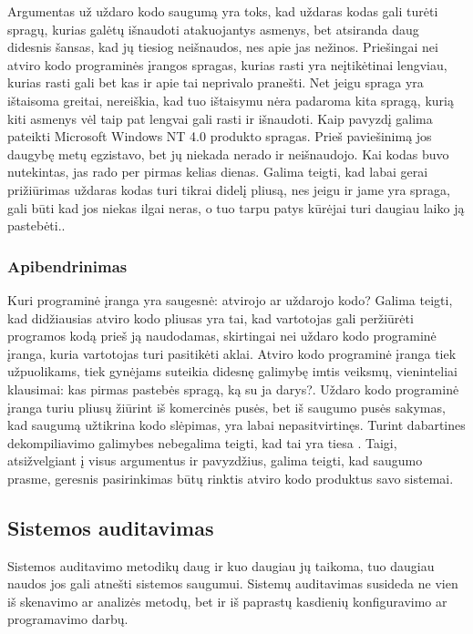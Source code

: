 \documentclass[a4paper,12pt,fleqn]{article}
\begin{document}
Argumentas už uždaro kodo saugumą yra toks, kad uždaras kodas gali turėti spragų, kurias galėtų išnaudoti atakuojantys asmenys, bet atsiranda daug didesnis šansas, kad jų tiesiog neišnaudos, nes apie jas nežinos\cite{ford2007open}.  Priešingai nei atviro kodo programinės įrangos spragas, kurias rasti yra neįtikėtinai lengviau, kurias rasti gali bet kas ir apie tai neprivalo pranešti. Net jeigu spraga yra ištaisoma greitai, nereiškia, kad tuo ištaisymu nėra padaroma kita spragą, kurią kiti asmenys vėl taip pat lengvai gali rasti ir išnaudoti. Kaip pavyzdį galima pateikti Microsoft Windows NT 4.0 produkto spragas. Prieš paviešinimą jos daugybę metų egzistavo, bet jų niekada nerado ir neišnaudojo. Kai kodas buvo nutekintas, jas rado per pirmas kelias dienas\cite{hoepman2008increased}.  Galima teigti, kad labai gerai prižiūrimas uždaras kodas turi tikrai didelį pliusą, nes jeigu ir jame yra spraga, gali būti kad jos niekas ilgai neras, o tuo tarpu patys kūrėjai turi daugiau laiko ją pastebėti.\cite{schryen2009open}.

\subsubsection{Apibendrinimas}
\label{sec:data}
Kuri programinė įranga yra saugesnė: atvirojo ar uždarojo kodo? Galima teigti, kad didžiausias atviro kodo pliusas yra tai, kad vartotojas gali peržiūrėti programos kodą prieš ją naudodamas, skirtingai nei uždaro kodo programinė įranga, kuria vartotojas turi pasitikėti aklai\cite{Cowan:2003:SSO:858866.859050}. Atviro kodo programinė įranga tiek užpuolikams, tiek gynėjams suteikia didesnę galimybę imtis veiksmų, vieninteliai klausimai: kas pirmas pastebės spragą, ką su ja darys?\cite{mishra2002quality}. Uždaro kodo programinė įranga turiu pliusų žiūrint iš komercinės pusės, bet iš saugumo pusės sakymas, kad saugumą užtikrina kodo slėpimas, yra labai nepasitvirtinęs. Turint dabartines dekompiliavimo galimybes nebegalima teigti, kad tai yra tiesa \cite{hoepman2008increased}. Taigi, atsižvelgiant į visus argumentus ir pavyzdžius, galima teigti, kad saugumo prasme, geresnis pasirinkimas būtų rinktis atviro kodo produktus savo sistemai.

\subsection{Sistemos auditavimas}

Sistemos auditavimo metodikų daug ir kuo daugiau jų taikoma, tuo daugiau naudos jos gali atnešti sistemos saugumui. Sistemų auditavimas susideda ne vien iš skenavimo ar analizės metodų, bet ir iš paprastų kasdienių konfiguravimo ar programavimo darbų.
\end{document}
